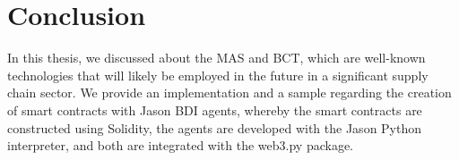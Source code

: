 \chapter{Conclusion}

In this thesis, we discussed about the \ac{MAS} and \ac{BCT}, which are well-known technologies that will likely be employed in the future in a significant supply chain sector. We provide an implementation and a sample regarding the creation of smart contracts with Jason \ac{BDI} agents, whereby the smart contracts are constructed using Solidity, the agents are developed with the Jason Python interpreter, and both are integrated with the web3.py package.